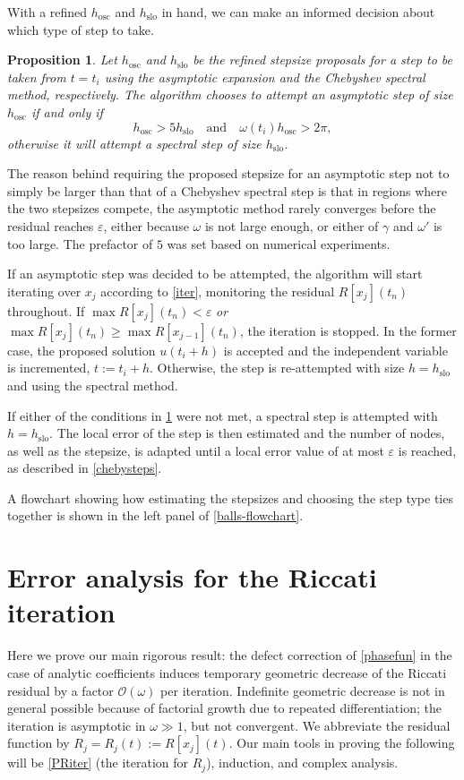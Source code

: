 \documentclass[10pt]{article}
\newcommand{\bigO}{{\mathcal O}}
\newtheorem{pro}[thm]{Proposition}
\newcommand{\om}{\omega}
\newcommand{\g}{\gamma}
\begin{document}
With a refined $h_{\text{osc}}$ and $h_{\text{slo}}$ in hand, we can make an informed decision about which type of step to take.
\begin{pro}\label{steptypechoose}
    Let $h_{\text{osc}}$ and $h_{\text{slo}}$ be the refined stepsize proposals
    for a step to be taken from $t = t_i$ using the asymptotic expansion and the Chebyshev
    spectral method, respectively. The algorithm chooses to attempt an
    asymptotic step of size $h_{\text{osc}}$ if and only if
$$ h_{\text{osc}} > 5h_{\text{slo}} \quad \text{and} \quad \omega(t_i) h_{\text{osc}} > 2\pi, $$
    otherwise it will attempt a spectral step of size $h_{\text{slo}}$.
\end{pro}
The reason behind requiring the proposed stepsize for an asymptotic step not to
simply be larger than that of a Chebyshev spectral step is that in regions
where the two stepsizes compete, the asymptotic method rarely converges before
the residual reaches $\varepsilon$, either because $\om$ is not large enough, or
either of $\g$ and $\om'$ is too large. The prefactor of $5$ was set based on numerical experiments. 

If an asymptotic step was decided to be attempted, the algorithm will start
iterating over $x_j$ according to \cref{iter}, monitoring the residual
$R[x_j](t_n)$ throughout. If $\max R[x_j](t_n) < \varepsilon$ \emph{or} $\max
R[x_j](t_n) \geq \max R[x_{j-1}](t_n)$, the iteration is stopped. In the former
case, the proposed solution $u(t_i+h)$ is accepted and the independent variable
is incremented, $t := t_i + h$. Otherwise, the step is re-attempted with size
$h = h_{\text{slo}}$ and using the spectral method. 

If either of the conditions in \cref{steptypechoose} were not met, a spectral
step is attempted with $h = h_{\text{slo}}$. The local error of the step is
then estimated and the number of nodes, as well as the stepsize, is
adapted until a local error value of at most $\varepsilon$ is reached, as described in
\cref{chebysteps}.

A flowchart showing how estimating the stepsizes and choosing the step type ties
together is shown in the left panel of \cref{balls-flowchart}.


\section{Error analysis for the Riccati iteration\label{errorana}}

Here we prove our main rigorous result:
the defect correction of \cref{phasefun}
in the case of analytic coefficients induces
temporary geometric decrease of the Riccati residual by a factor $\bigO(\om)$ per iteration.
Indefinite geometric decrease is not in general possible because of
factorial growth due to repeated differentiation;
the iteration is asymptotic in $\om\gg 1$, but not convergent.
We abbreviate the residual function by $R_j = R_j(t) := R[x_j](t)$.
Our main tools in proving the following will be \cref{PRiter} (the iteration for $R_j$), induction, and complex analysis.
\end{document}
